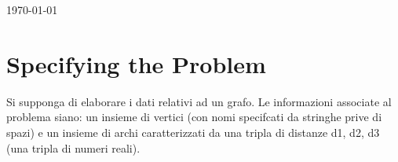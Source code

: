 \documentclass[11pt, a4paper, titlepage, block]{article}
\begin{document}
\begin{titlepage}

{\large \today}\\[10cm] %


 

\newpage

\end{titlepage}

\section{Specifying the Problem}
	Si supponga di elaborare i dati relativi ad un grafo. Le informazioni associate al problema siano: un insieme di vertici (con nomi specifcati da stringhe prive di spazi) e un insieme di archi caratterizzati da una tripla di distanze d1, d2, d3 (una tripla di numeri reali).
\end{document}
